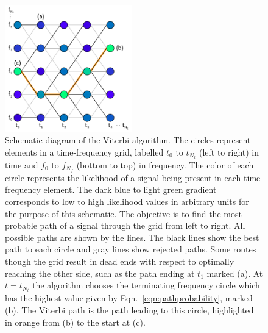 \documentclass[paper-main.tex]{subfiles}
\begin{document}
\begin{figure}
\includegraphics[width=0.49\textwidth]{figures/viterbiDiagramBlue.pdf}
\caption{\label{fig:viterbi}
Schematic diagram of the Viterbi algorithm. 
The circles represent elements in a time-frequency grid, labelled $t_0$ to $t_{N_t}$ (left to right) in time and $f_0$ to $f_{N_f}$ (bottom to top) in frequency. 
The color of each circle represents the likelihood of a signal being present in each time-frequency element.
The dark blue to light green gradient corresponds to low to high likelihood values in arbitrary units for the purpose of this schematic. 
The objective is to find the most probable path of a signal through the grid from left to right.
All possible paths are shown by the lines. 
The black lines show the best path to each circle and gray lines show rejected paths. 
Some routes though the grid result in dead ends with respect to optimally reaching the other side, such as the path ending at $t_1$ marked (a).
At $t=t_{N_t}$ the algorithm chooses the terminating frequency circle which has the highest value given by Eqn.~\ref{eqn:pathprobability}, marked (b). 
The Viterbi path is the path leading to this circle, highlighted in orange from (b) to the start at (c). 
}
\end{figure}
\end{document}
